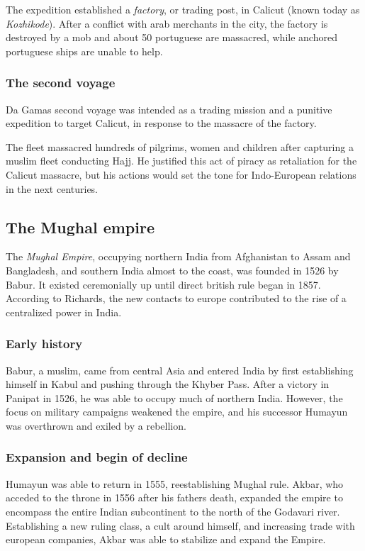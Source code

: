 \documentclass[11pt, a4paper, headings=standardclasses]{scrartcl}
\begin{document}
The expedition established a \emph{factory}, or trading post, in Calicut (known today as \textit{Kozhikode}). After a conflict with arab merchants in the city, the factory is destroyed by a mob and  about 50 portuguese are massacred, while anchored portuguese ships are unable to help.\autocite{1550}

\subsubsection{The second voyage}

Da Gamas second voyage was intended as a trading mission and a punitive expedition to target Calicut, in response to the massacre of the factory.\autocite{Vasco}

The fleet massacred hundreds of pilgrims, women and children after capturing a muslim fleet conducting Hajj. He justified this act of piracy as retaliation for the Calicut massacre,\autocite{1550} but his actions would set the tone for Indo-European relations in the next centuries.

\subsection{The Mughal empire}

The \emph{Mughal Empire}, occupying northern India from Afghanistan to Assam and Bangladesh, and southern India almost to the coast, was founded in 1526 by Babur. It existed ceremonially up until direct british rule began in 1857.
According to Richards, the new contacts to europe contributed to the rise of a centralized power in India.\autocite[6]{richards}
\subsubsection{Early history}

Babur, a muslim, came from central Asia and entered India by first establishing himself in Kabul and pushing through the Khyber Pass.
 After a victory in Panipat in 1526, he was able to occupy much of northern India. However, the focus on military campaigns weakened the empire, and his successor Humayun was overthrown and exiled by a rebellion.\autocite[Chapter 1]{richards}

\subsubsection{Expansion and begin of decline}

Humayun was able to return in 1555, reestablishing Mughal rule.\autocite[12]{richards} Akbar, who acceded to the throne in 1556 after his fathers death, expanded the empire to encompass the entire Indian subcontinent to the north of the Godavari river. Establishing a new ruling class, a cult around himself, and increasing trade with european companies, Akbar was able to stabilize and expand the Empire.\autocite[16]{richards}
\end{document}
